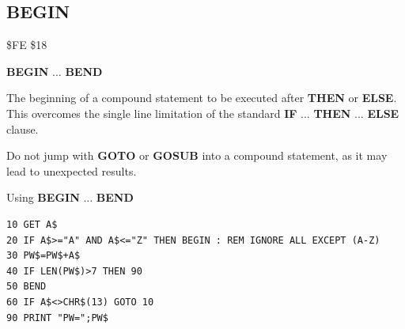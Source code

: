 \subsection{BEGIN}
\begin{description}[leftmargin=2cm,style=nextline]
\item [Token:]   \$FE \$18

\item [Format:]  {\bf BEGIN} ... {\bf BEND}

\item [Usage:]   The beginning of a compound statement to be executed after {\bf THEN} or {\bf ELSE}. This overcomes the single line limitation of the standard {\bf IF} ... {\bf THEN} ... {\bf ELSE} clause.

\item [Remarks:] Do not jump with {\bf GOTO} or {\bf GOSUB} into a compound statement, as it may lead to unexpected results.

\item [Example:] Using {\bf BEGIN} ... {\bf BEND}

\begin{tcolorbox}[colback=black,coltext=white]
\verbatimfont{\codefont}
\begin{verbatim}
10 GET A$
20 IF A$>="A" AND A$<="Z" THEN BEGIN : REM IGNORE ALL EXCEPT (A-Z)
30 PW$=PW$+A$
40 IF LEN(PW$)>7 THEN 90
50 BEND
60 IF A$<>CHR$(13) GOTO 10
90 PRINT "PW=";PW$
\end{verbatim}
\end{tcolorbox}
\end{description}


\newpage

